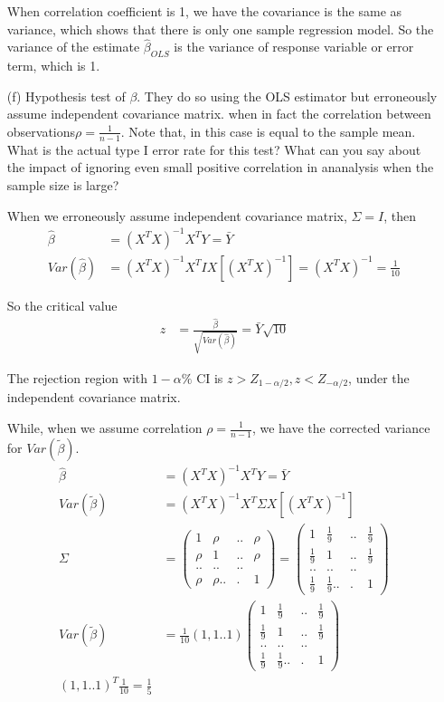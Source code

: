 \begin{itemize}
When correlation coefficient is 1, we have the covariance is the same as variance, which shows that there is only one sample regression model. So the variance of the estimate $\hat{\beta}_{OLS}$ is the variance of response variable or error term, which is 1.

\item[(f)] Hypothesis test of $\beta$. They do so using the OLS estimator but erroneously assume independent covariance matrix. when in fact the correlation between observations$\rho = \frac{1}{n-1}$. Note that, in this case is equal to the sample mean. What is the actual type I error rate for this test? What can you say about the impact of ignoring even small positive correlation in ananalysis when the sample size is large?

When we erroneously assume independent covariance matrix, $\Sigma = I$, then 
\begin{align*}
	\hat{\beta}  &=  (X^T X)^{-1}X^T Y = \bar{Y}\\
	Var(\hat{\beta} ) &= (X^T X)^{-1}X^T I X [(X^T X)^{-1}] = (X^T X)^{-1} = \frac{1}{10}
\end{align*}

So the critical value 
\begin{align*}
	z &= \frac{\hat{\beta} }{\sqrt{Var(\hat{\beta})}}  =  \bar{Y} \sqrt{10}
\end{align*}

The rejection region with $1-\alpha \%$ CI is $z > Z_{1-\alpha/2}, z < Z_{-\alpha/2}$, under the independent covariance matrix.


While, when we assume correlation $\rho = \frac{1}{n-1}$, we have the corrected variance for $Var(\tilde{\beta} )$. 
\begin{align*}
	\hat{\beta}  &=  (X^T X)^{-1}X^T Y = \bar{Y}\\
	Var(\tilde{\beta} ) &= (X^T X)^{-1}X^T \Sigma X [(X^T X)^{-1}]  \\
	\Sigma &= \begin{pmatrix}
		1 & \rho &.. & \rho \\
		\rho & 1 &.. & \rho\\
		.. &.. & ..& \\
		\rho & \rho ..&. & 1 
	\end{pmatrix} = \begin{pmatrix}
		1 & \frac{1}{9} &.. & \frac{1}{9} \\
		\frac{1}{9}  & 1 &.. & \frac{1}{9} \\
		.. &.. & ..& \\
		\frac{1}{9}  & \frac{1}{9}  ..&. & 1 
	\end{pmatrix} \\
	Var(\tilde{\beta} ) &= \frac{1}{10} (1,1..1) \begin{pmatrix}
		1 & \frac{1}{9} &.. & \frac{1}{9} \\
		\frac{1}{9}  & 1 &.. & \frac{1}{9} \\
		.. &.. & ..& \\
		\frac{1}{9}  & \frac{1}{9}  ..&. & 1 
	\end{pmatrix} \\ (1,1..1)^T \frac{1}{10}  = \frac{1}{5}
\end{align*}


\end{itemize}
